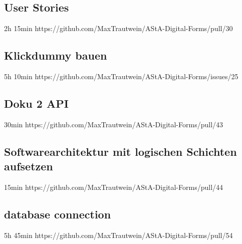 \subsection{User Stories}
2h 15min
https://github.com/MaxTrautwein/AStA-Digital-Forms/pull/30

\subsection{Klickdummy bauen}
5h 10min
https://github.com/MaxTrautwein/AStA-Digital-Forms/issues/25


\subsection{Doku 2 API}
30min
https://github.com/MaxTrautwein/AStA-Digital-Forms/pull/43

\subsection{Softwarearchitektur mit logischen Schichten aufsetzen }
15min
https://github.com/MaxTrautwein/AStA-Digital-Forms/pull/44
\subsection{database connection}
5h 45min
https://github.com/MaxTrautwein/AStA-Digital-Forms/pull/54
\subsection{}


\subsection{}


\subsection{}